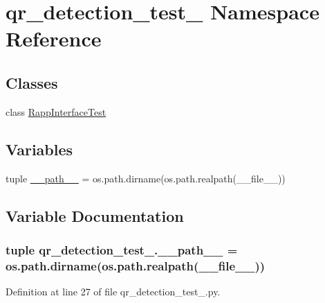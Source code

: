 \hypertarget{namespaceqr__detection__test__1}{\section{qr\-\_\-detection\-\_\-test\-\_ Namespace Reference}
\label{namespaceqr__detection__test__1}
}
\subsection*{Classes}
\begin{DoxyCompactItemize}
\item 
class \hyperlink{classqr__detection__test__1_1_1RappInterfaceTest}{Rapp\-Interface\-Test}
\end{DoxyCompactItemize}
\subsection*{Variables}
\begin{DoxyCompactItemize}
\item 
tuple \hyperlink{namespaceqr__detection__test__1_a4b0c3f052306fad18d6fda4b89e808f5}{\-\_\-\-\_\-path\-\_\-\-\_\-} = os.\-path.\-dirname(os.\-path.\-realpath(\-\_\-\-\_\-file\-\_\-\-\_\-))
\end{DoxyCompactItemize}


\subsection{Variable Documentation}
\hypertarget{namespaceqr__detection__test__1_a4b0c3f052306fad18d6fda4b89e808f5}{
\subsubsection[{\-\_\-\-\_\-path\-\_\-\-\_\-}]{\setlength{\rightskip}{0pt plus 5cm}tuple qr\-\_\-detection\-\_\-test\-\_.\-\_\-\-\_\-path\-\_\-\-\_\- = os.\-path.\-dirname(os.\-path.\-realpath(\-\_\-\-\_\-file\-\_\-\-\_\-))}}\label{namespaceqr__detection__test__1_a4b0c3f052306fad18d6fda4b89e808f5}


Definition at line 27 of file qr\-\_\-detection\-\_\-test\-\_.\-py.

